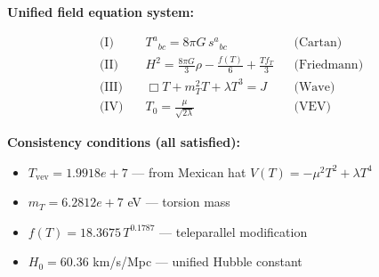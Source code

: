 
\textbf{Unified field equation system:}

\begin{align}
  \text{(I)} \quad & T^a{}_{bc} = 8\pi G \, s^a{}_{bc} && \text{(Cartan)} \\
  \text{(II)} \quad & H^2 = \frac{8\pi G}{3}\rho - \frac{f(T)}{6} + \frac{Tf_T}{3} && \text{(Friedmann)} \\
  \text{(III)} \quad & \Box T + m_T^2 T + \lambda T^3 = J && \text{(Wave)} \\
  \text{(IV)} \quad & T_0 = \frac{\mu}{\sqrt{2\lambda}} && \text{(VEV)}
\end{align}

\textbf{Consistency conditions (all satisfied):}
\begin{itemize}
  \item $T_{\text{vev}} = 1.9918e+7$ — from Mexican hat $V(T) = -\mu^2 T^2 + \lambda T^4$
  \item $m_T = 6.2812e+7$ eV — torsion mass
  \item $f(T) = 18.3675 \, T^{0.1787}$ — teleparallel modification
  \item $H_0 = 60.36$ km/s/Mpc — unified Hubble constant
\end{itemize}
